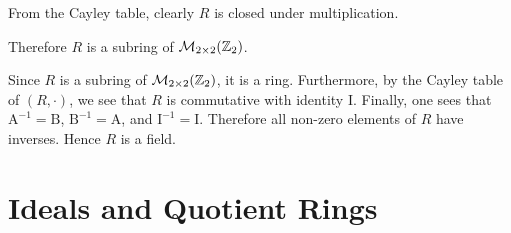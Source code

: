 \begin{questions}
\begin{partquestions}{\roman*}
\begin{itemize}
            From the Cayley table, clearly $R$ is closed under multiplication.
        \end{itemize}
        Therefore $R$ is a subring of $\mathcal{M}_{2\times2}(\mathbb{Z}_2)$.

        \item Since $R$ is a subring of $\mathcal{M}_{2\times2}(\mathbb{Z}_2)$, it is a ring. Furthermore, by the Cayley table of $(R, \cdot)$, we see that $R$ is commutative with identity I. Finally, one sees that $\mathrm{A}^{-1} = \mathrm{B}$, $\mathrm{B}^{-1} = \mathrm{A}$, and $\mathrm{I}^{-1} = \mathrm{I}$. Therefore all non-zero elements of $R$ have inverses. Hence $R$ is a field.
    \end{partquestions}
\end{questions}

\section{Ideals and Quotient Rings}
